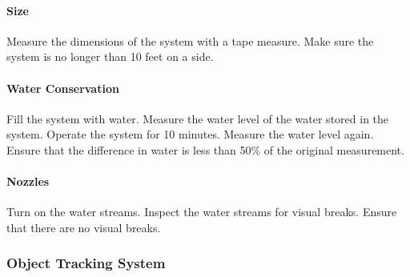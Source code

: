 \paragraph{Size}
Measure the dimensions of the system with a tape measure. Make sure the system is no longer than 10 feet on a side. 

\paragraph{Water Conservation}
Fill the system with water. Measure the water level of the water stored in the system. Operate the system for 10 minutes. Measure the water level again. Ensure that the difference in water is less than 50\% of the original measurement. 


\paragraph{Nozzles}
Turn on the water streams. Inspect the water streams for visual breaks. Ensure that there are no visual breaks.



\subsubsection{Object Tracking System}

%
%


